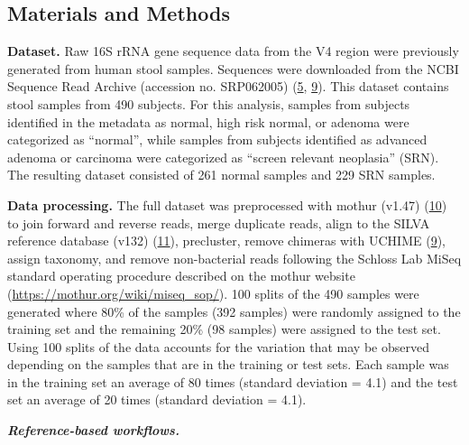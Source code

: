 \documentclass[
]{article}
\begin{document}
\hypertarget{materials-and-methods}{%
\subsection{Materials and Methods}\label{materials-and-methods}}

\textbf{Dataset.} Raw 16S rRNA gene sequence data from the V4 region
were previously generated from human stool samples. Sequences were
downloaded from the NCBI Sequence Read Archive (accession no. SRP062005)
(\protect\hyperlink{ref-baxter2016}{5},
\protect\hyperlink{ref-edgar2011}{9}). This dataset contains stool
samples from 490 subjects. For this analysis, samples from subjects
identified in the metadata as normal, high risk normal, or adenoma were
categorized as ``normal'', while samples from subjects identified as
advanced adenoma or carcinoma were categorized as ``screen relevant
neoplasia'' (SRN). The resulting dataset consisted of 261 normal samples
and 229 SRN samples.

\textbf{Data processing.} The full dataset was preprocessed with mothur
(v1.47) (\protect\hyperlink{ref-schloss2009}{10}) to join forward and
reverse reads, merge duplicate reads, align to the SILVA reference
database (v132) (\protect\hyperlink{ref-quast2013}{11}), precluster,
remove chimeras with UCHIME (\protect\hyperlink{ref-edgar2011}{9}),
assign taxonomy, and remove non-bacterial reads following the Schloss
Lab MiSeq standard operating procedure described on the mothur website
(\url{https://mothur.org/wiki/miseq_sop/}). 100 splits of the 490
samples were generated where 80\% of the samples (392 samples) were
randomly assigned to the training set and the remaining 20\% (98
samples) were assigned to the test set. Using 100 splits of the data
accounts for the variation that may be observed depending on the samples
that are in the training or test sets. Each sample was in the training
set an average of 80 times (standard deviation = 4.1) and the test set
an average of 20 times (standard deviation = 4.1).

\textbf{\emph{Reference-based workflows.}}
\end{document}
